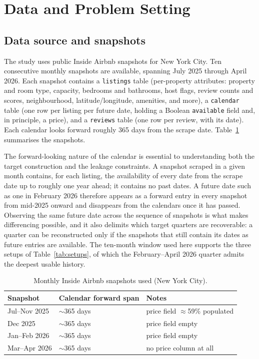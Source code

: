 \documentclass[review,12pt]{elsarticle}
\begin{document}
\section{Data and Problem Setting}
\label{sec:data}
\subsection{Data source and snapshots}
The study uses public Inside Airbnb snapshots \citep{insideairbnb} for New York
City. Ten consecutive monthly snapshots are available, spanning July 2025 through
April 2026. Each snapshot contains a \texttt{listings} table (per-property
attributes: property and room type, capacity, bedrooms and bathrooms, host flags,
review counts and scores, neighbourhood, latitude/longitude, amenities, and more),
a \texttt{calendar} table (one row per listing per future date, holding a Boolean
\texttt{available} field and, in principle, a price), and a \texttt{reviews} table
(one row per review, with its date). Each calendar looks forward roughly 365 days
from the scrape date. Table~\ref{tab:snapshots} summarises the snapshots.

The forward-looking nature of the calendar is essential to understanding both the
target construction and the leakage constraints. A snapshot scraped in a given
month contains, for each listing, the availability of every date from the scrape
date up to roughly one year ahead; it contains no past dates. A future date such as
one in February 2026 therefore appears as a forward entry in every snapshot from
mid-2025 onward and disappears from the calendars once it has passed. Observing the
same future date across the sequence of snapshots is what makes differencing
possible, and it also delimits which target quarters are recoverable: a quarter can
be reconstructed only if the snapshots that still contain its dates as future
entries are available. The ten-month window used here supports the three setups of
Table~\ref{tab:setups}, of which the February--April 2026 quarter admits the
deepest usable history.

\begin{table}[!t]
\caption{Monthly Inside Airbnb snapshots used (New York City).}
\label{tab:snapshots}
\centering
\small
\begin{tabular}{lll}
\toprule
Snapshot & Calendar forward span & Notes \\
\midrule
Jul--Nov 2025 & $\sim$365 days & price field $\approx$59\% populated \\
Dec 2025 & $\sim$365 days & price field empty \\
Jan--Feb 2026 & $\sim$365 days & price field empty \\
Mar--Apr 2026 & $\sim$365 days & no price column at all \\
\bottomrule
\end{tabular}
\end{table}
\end{document}

